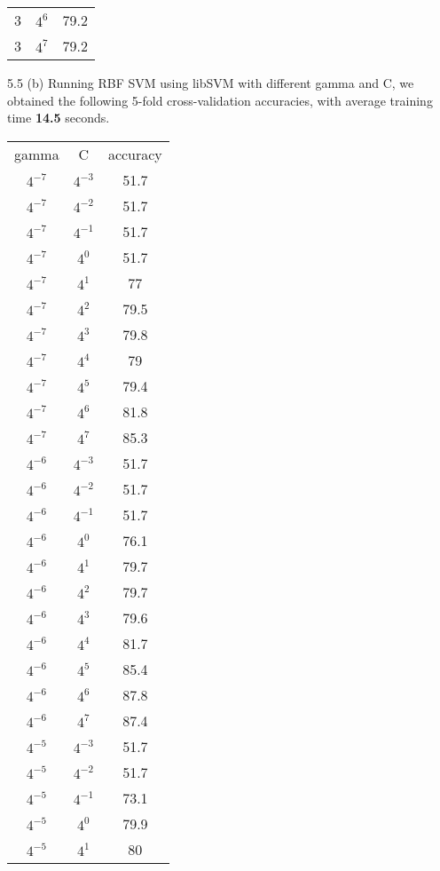\documentclass[12pt]{article}
\newenvironment{problem}[2][Problem]{\begin{trivlist}
\item[\hskip \labelsep {\bfseries #1}\hskip \labelsep {\bfseries #2}]}{\end{trivlist}}
\begin{document}
\begin{problem}{5. Programming}
\begin{center}
\begin{tabular}{ c | c | c }
    3  &  $4^{6}$  &79.2\\
    3  &  $4^{7}$ & 79.2\\
\end{tabular}
\end{center}
\vspace{50pt}
\item{5.5 (b)}
Running RBF SVM using libSVM with different gamma and C, we obtained the following 5-fold cross-validation accuracies, with average training time \textbf{14.5} seconds.
\begin{center}
\begin{tabular}{ c | c | c }
gamma & C & accuracy\\
$4^{-7}$   & $4^{-3}$  &  51.7\\
$4^{-7}$   & $4^{-2}$  &  51.7\\
$4^{-7}$   & $4^{-1}$  &  51.7\\
$4^{-7}$   & $4^{0}$  &  51.7\\
$4^{-7}$   & $4^{1}$  &  77\\
$4^{-7}$   & $4^{2}$  &  79.5\\
$4^{-7}$   & $4^{3}$  &  79.8\\
$4^{-7}$   & $4^{4}$  &  79\\
$4^{-7}$   & $4^{5}$  &  79.4\\
$4^{-7}$   & $4^{6}$  &  81.8\\
$4^{-7}$   & $4^{7}$  &  85.3\\
$4^{-6}$   & $4^{-3}$  &  51.7\\
$4^{-6}$   & $4^{-2}$  &  51.7\\
$4^{-6}$   & $4^{-1}$  &  51.7\\
$4^{-6}$   & $4^{0}$  &  76.1\\
$4^{-6}$   & $4^{1}$  &  79.7\\
$4^{-6}$   & $4^{2}$  &  79.7\\
$4^{-6}$   & $4^{3}$  &  79.6\\
$4^{-6}$   & $4^{4}$  &  81.7\\
$4^{-6}$   & $4^{5}$  &  85.4\\
$4^{-6}$   & $4^{6}$  &  87.8\\
$4^{-6}$   & $4^{7}$  &  87.4\\
$4^{-5}$   & $4^{-3}$  &  51.7\\
$4^{-5}$   & $4^{-2}$  &  51.7\\
$4^{-5}$   & $4^{-1}$  &  73.1\\
$4^{-5}$   & $4^{0}$  &  79.9\\
$4^{-5}$   & $4^{1}$  &  80\\

\end{tabular}
\end{center}
\end{problem}
\end{document}
